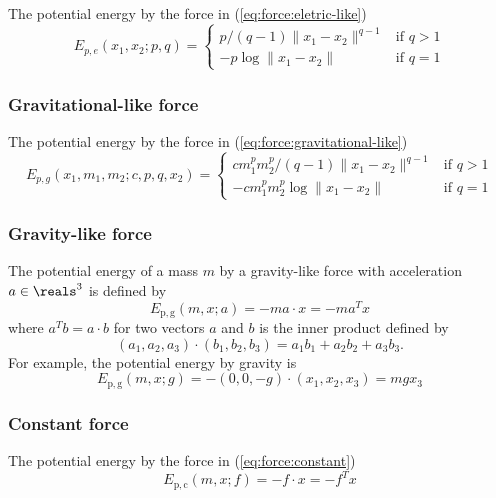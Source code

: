 \documentclass{article}
\begin{document}
The potential energy by the force in (\ref{eq:force:eletric-like})
\begin{equation}
\label{eq:energy:potential:eletric-like}
	E_{p,e}(x_1,x_2;p,q)
	=
	\left\{
	\begin{array}{ll}
		{p}/{(q-1)\|x_1-x_2\|^{q-1}}
		&
		\mbox{if } q > 1
		\\
		-p \log\|x_1-x_2\|
		&
		\mbox{if } q=1
	\end{array}
	\right.
\end{equation}

\subsubsection{Gravitational-like force}

The potential energy by the force in (\ref{eq:force:gravitational-like})
\begin{equation}
\label{eq:energy:potential:eletric-like}
	E_{p,g}(x_1,m_1,m_2;c,p,q,x_2)
	=
	\left\{
	\begin{array}{ll}
		{cm_1^pm_2^p}/{(q-1)\|x_1-x_2\|^{q-1}}
		&
		\mbox{if } q > 1
		\\
		- cm_1^pm_2^p\log\|x_1-x_2\|
		&
		\mbox{if } q=1
	\end{array}
	\right.
\end{equation}

\subsubsection{Gravity-like force}

The potential energy of a mass $m$ by a gravity-like force with acceleration $a\in\reals^3$
is defined by
\begin{equation}
\label{eq:energy:potential:gravity-like}
E_\mathrm{p,g}(m,x;a)
=  - m a\cdot x
= - m a^Tx
\end{equation}
where $a^Tb = a\cdot b$ for two vectors $a$ and $b$
is the inner product defined by
\[
	(a_1,a_2,a_3) \cdot (b_1,b_2,b_3) = a_1b_1 + a_2b_2 + a_3b_3.
\]
For example, the potential energy by gravity is
\[
	E_\mathrm{p,g}(m,x;g)
	= -(0,0,-g) \cdot (x_1,x_2,x_3)
	=  mgx_3
\]

\subsubsection{Constant force}

The potential energy by the force in (\ref{eq:force:constant})
\begin{equation}
\label{eq:energy:potential:constant}
E_\mathrm{p,c}(m,x;f)
=  - f\cdot x
= - f^Tx
\end{equation}
\end{document}
